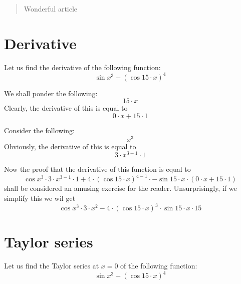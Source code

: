 \documentclass{article}
\begin{document}
\maketitle
\begin{abstract}
Wonderful article
\end{abstract}
\newpage
\section{Derivative}
Let us find the derivative of the following function:
\begin{equation}
\sin x ^{3 } + \left( \cos 15 \cdot x \right) ^{4 } 
\end{equation}

We shall ponder the following:
\begin{equation}
15 \cdot x 
\end{equation}
Clearly, the derivative of this is equal to
\begin{equation}
0 \cdot x + 15 \cdot 1 
\end{equation}

Consider the following:
\begin{equation}
x ^{3 } 
\end{equation}
Obviously, the derivative of this is equal to
\begin{equation}
3 \cdot x ^{3 - 1 } \cdot 1 
\end{equation}

Now the proof that the derivative of this function is equal to
\begin{equation}
\cos x ^{3 } \cdot 3 \cdot x ^{3 - 1 } \cdot 1 + 4 \cdot \left( \cos 15 \cdot x \right) ^{4 - 1 } \cdot -\sin 15 \cdot x \cdot \left( 0 \cdot x + 15 \cdot 1 \right) 
\end{equation}
shall be considered an amusing exercise for the reader.
Unsurprisingly, if we simplify this we wil get
\begin{equation}
\cos x ^{3 } \cdot 3 \cdot x ^{2 } - 4 \cdot \left( \cos 15 \cdot x \right) ^{3 } \cdot \sin 15 \cdot x \cdot 15 
\end{equation}
\newpage
\section{Taylor series}
Let us find the Taylor series at $x = 0$ of the following function:
\begin{equation}
\sin x ^{3 } + \left( \cos 15 \cdot x \right) ^{4 } 
\end{equation}
\end{document}
